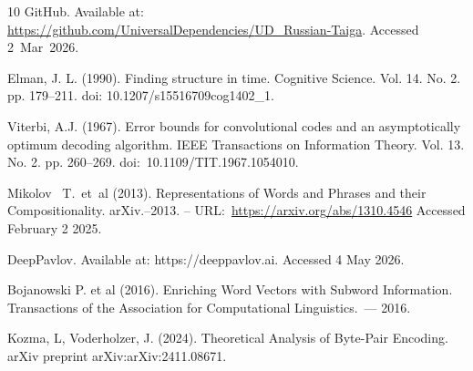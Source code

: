 \documentclass[11pt,twocolumn]{article}
\begin{document}
\begin{thebibliography}{10}
  GitHub. Available at: \href{https://github.com/UniversalDependencies/UD\_Russian-Taiga}{https://github.com{\slash}UniversalDependencies{\slash}UD\_Russian-Taiga}.
  Accessed 2~Mar~2026.

  Elman, J. L. (1990).
  Finding structure in time. Cognitive Science. Vol. 14. No. 2. pp. 179--211. doi: 10.1207{\slash}s15516709cog1402\_1.
  
  Viterbi, A.J. (1967).
  Error bounds for convolutional codes and an asymptotically
  optimum decoding algorithm.
  IEEE Transactions on Information Theory. Vol. 13. No. 2. pp. 260--269.
  doi:~10.1109{\slash}TIT.1967.1054010.

  Mikolov~  T.~et~al (2013).
  Representations of Words and Phrases and their Compositionality.
  arXiv.--2013. -- URL:~\href{https://arxiv.org/abs/1310.4546}{https://arxiv.org{\slash}abs{\slash}1310.4546}
  Accessed February 2 2025.

  DeepPavlov. Available at: https://deeppavlov.ai. Accessed 4 May 2026.


Bojanowski   P. et al (2016).
    Enriching Word Vectors with Subword Information.
    Transactions of the Association for Computational Linguistics.~--- 2016.

Kozma, L, Voderholzer, J. (2024).
    Theoretical Analysis of Byte-Pair Encoding.
    arXiv preprint arXiv:arXiv:2411.08671.

\end{thebibliography}
\end{document}
